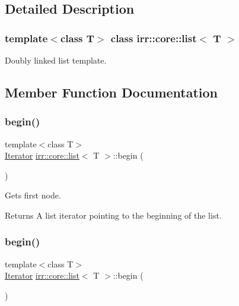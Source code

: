 \subsection{Detailed Description}
\subsubsection*{template$<$class T$>$\newline
class irr\+::core\+::list$<$ T $>$}

Doubly linked list template. 

\subsection{Member Function Documentation}
\mbox{\label{classirr_1_1core_1_1list_aebd05a0f5e5ead6e1d5b6e3973da8039}} 
\subsubsection{\texorpdfstring{begin()}{begin()}\hspace{0.1cm}{\footnotesize\ttfamily [1/4]}}
{\footnotesize\ttfamily template$<$class T$>$ \\
\hyperlink{classirr_1_1core_1_1list_1_1Iterator}{Iterator} \hyperlink{classirr_1_1core_1_1list}{irr\+::core\+::list}$<$ T $>$\+::begin (\begin{DoxyParamCaption}{ }\end{DoxyParamCaption})\hspace{0.3cm}{\ttfamily [inline]}}



Gets first node. 

\begin{DoxyReturn}{Returns}
A list iterator pointing to the beginning of the list. 
\end{DoxyReturn}
\mbox{\label{classirr_1_1core_1_1list_aebd05a0f5e5ead6e1d5b6e3973da8039}} 
\subsubsection{\texorpdfstring{begin()}{begin()}\hspace{0.1cm}{\footnotesize\ttfamily [2/4]}}
{\footnotesize\ttfamily template$<$class T$>$ \\
\hyperlink{classirr_1_1core_1_1list_1_1Iterator}{Iterator} \hyperlink{classirr_1_1core_1_1list}{irr\+::core\+::list}$<$ T $>$\+::begin (\begin{DoxyParamCaption}{ }\end{DoxyParamCaption})\hspace{0.3cm}{\ttfamily [inline]}}



